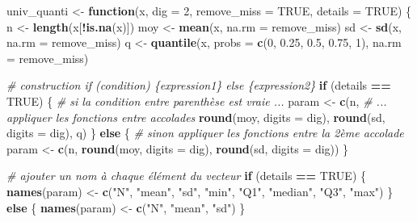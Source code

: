 \documentclass[
]{book}
\newenvironment{Shaded}{\begin{snugshade}}{\end{snugshade}}
\newcommand{\AttributeTok}[1]{\textcolor[rgb]{0.13,0.29,0.53}{#1}}
\newcommand{\CommentTok}[1]{\textcolor[rgb]{0.56,0.35,0.01}{\textit{#1}}}
\newcommand{\ConstantTok}[1]{\textcolor[rgb]{0.56,0.35,0.01}{#1}}
\newcommand{\ControlFlowTok}[1]{\textcolor[rgb]{0.13,0.29,0.53}{\textbf{#1}}}
\newcommand{\DecValTok}[1]{\textcolor[rgb]{0.00,0.00,0.81}{#1}}
\newcommand{\FloatTok}[1]{\textcolor[rgb]{0.00,0.00,0.81}{#1}}
\newcommand{\FunctionTok}[1]{\textcolor[rgb]{0.13,0.29,0.53}{\textbf{#1}}}
\newcommand{\NormalTok}[1]{#1}
\newcommand{\OtherTok}[1]{\textcolor[rgb]{0.56,0.35,0.01}{#1}}
\newcommand{\SpecialCharTok}[1]{\textcolor[rgb]{0.81,0.36,0.00}{\textbf{#1}}}
\newcommand{\StringTok}[1]{\textcolor[rgb]{0.31,0.60,0.02}{#1}}
\begin{document}
\begin{Shaded}
\begin{Highlighting}[]
\NormalTok{univ\_quanti }\OtherTok{\textless{}{-}} \ControlFlowTok{function}\NormalTok{(x, }\AttributeTok{dig =} \DecValTok{2}\NormalTok{, }\AttributeTok{remove\_miss =} \ConstantTok{TRUE}\NormalTok{, }\AttributeTok{details =} \ConstantTok{TRUE}\NormalTok{) \{ }
\NormalTok{  n }\OtherTok{\textless{}{-}} \FunctionTok{length}\NormalTok{(x[}\SpecialCharTok{!}\FunctionTok{is.na}\NormalTok{(x)])     }
\NormalTok{  moy }\OtherTok{\textless{}{-}} \FunctionTok{mean}\NormalTok{(x, }\AttributeTok{na.rm =}\NormalTok{ remove\_miss)}
\NormalTok{  sd }\OtherTok{\textless{}{-}} \FunctionTok{sd}\NormalTok{(x, }\AttributeTok{na.rm =}\NormalTok{ remove\_miss)}
\NormalTok{  q }\OtherTok{\textless{}{-}} \FunctionTok{quantile}\NormalTok{(x, }\AttributeTok{probs =} \FunctionTok{c}\NormalTok{(}\DecValTok{0}\NormalTok{, }\FloatTok{0.25}\NormalTok{, }\FloatTok{0.5}\NormalTok{, }\FloatTok{0.75}\NormalTok{, }\DecValTok{1}\NormalTok{), }\AttributeTok{na.rm =}\NormalTok{ remove\_miss)}
  
  \CommentTok{\# construction if (condition) \{expression1\} else \{expression2\}}
  \ControlFlowTok{if}\NormalTok{ (details }\SpecialCharTok{==} \ConstantTok{TRUE}\NormalTok{) \{ }\CommentTok{\# si la condition entre parenthèse est vraie ...}
\NormalTok{    param }\OtherTok{\textless{}{-}} \FunctionTok{c}\NormalTok{(n,        }\CommentTok{\# ... appliquer les fonctions entre accolades}
               \FunctionTok{round}\NormalTok{(moy, }\AttributeTok{digits =}\NormalTok{ dig), }
               \FunctionTok{round}\NormalTok{(sd, }\AttributeTok{digits =}\NormalTok{ dig), }
\NormalTok{               q)}
\NormalTok{  \} }\ControlFlowTok{else}\NormalTok{ \{ }\CommentTok{\# sinon appliquer les fonctions entre la 2ème accolade}
\NormalTok{    param }\OtherTok{\textless{}{-}} \FunctionTok{c}\NormalTok{(n, }
               \FunctionTok{round}\NormalTok{(moy, }\AttributeTok{digits =}\NormalTok{ dig), }
               \FunctionTok{round}\NormalTok{(sd, }\AttributeTok{digits =}\NormalTok{ dig))}
\NormalTok{  \}}
  
  \CommentTok{\# ajouter un nom à chaque élément du vecteur}
  \ControlFlowTok{if}\NormalTok{ (details }\SpecialCharTok{==} \ConstantTok{TRUE}\NormalTok{) \{}
    \FunctionTok{names}\NormalTok{(param) }\OtherTok{\textless{}{-}} \FunctionTok{c}\NormalTok{(}\StringTok{"N"}\NormalTok{, }\StringTok{"mean"}\NormalTok{, }\StringTok{"sd"}\NormalTok{, }\StringTok{"min"}\NormalTok{, }\StringTok{"Q1"}\NormalTok{, }\StringTok{"median"}\NormalTok{, }\StringTok{"Q3"}\NormalTok{, }\StringTok{"max"}\NormalTok{)}
\NormalTok{  \} }\ControlFlowTok{else}\NormalTok{ \{}
    \FunctionTok{names}\NormalTok{(param) }\OtherTok{\textless{}{-}} \FunctionTok{c}\NormalTok{(}\StringTok{"N"}\NormalTok{, }\StringTok{"mean"}\NormalTok{, }\StringTok{"sd"}\NormalTok{)}
\NormalTok{  \}}
  

\end{Highlighting}
\end{Shaded}
\end{document}
